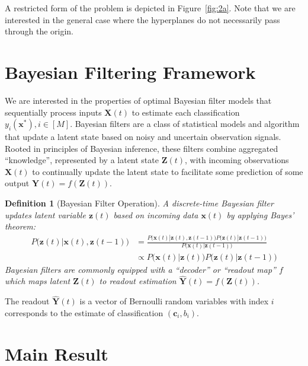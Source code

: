 \documentclass[12pt]{article}
\newtheorem{definition}{Definition}
\begin{document}
A restricted form of the problem is depicted in Figure~\ref{fig:2a}. Note that we are interested in the general case where the hyperplanes do not necessarily pass through the origin. 




\section{Bayesian Filtering Framework}

We are interested in the properties of optimal Bayesian filter models that sequentially process inputs $\mathbf X(t)$ to estimate each classification $y_i(\mathbf x^*), i\in [M]$. 
Bayesian filters are a class of statistical models and algorithm that update a latent state based on noisy and uncertain observation signals. 
Rooted in principles of Bayesian inference, these filters combine aggregated ``knowledge'', represented by a latent state $\mathbf Z(t)$, with incoming observations $\mathbf X(t)$ to continually update the latent state to facilitate some prediction of some output $\mathbf Y(t) = f(\mathbf Z(t))$. 


\begin{definition}[Bayesian Filter Operation]
	\label{def:bayesian_filter}
	A discrete-time Bayesian filter updates latent variable $\mathbf z(t)$
	based on incoming data $\mathbf x(t)$ by applying Bayes' theorem: 
	\begin{align}
		\label{eqn:bayes_filter}
		P \big(\mathbf z(t) | \mathbf  x(t), \mathbf z(t-1)\big) &= \frac{
			P\big(\mathbf x(t) | \mathbf z(t), \mathbf z(t-1)\big) 
			P\big(\mathbf z(t) | \mathbf z(t-1)\big)
		}{
			P\big(\mathbf x(t) | \mathbf z(t-1)\big)
		} \\
		&\propto P\big(\mathbf x(t) | \mathbf z(t) \big) 
			P\big(\mathbf z(t) | \mathbf z(t-1)\big)
	\end{align}
	Bayesian filters are commonly equipped with a ``decoder'' or ``readout
	map'' $f$ which maps latent $\mathbf Z(t)$ to readout estimation
	$\hat{\mathbf Y}(t) = f(\mathbf Z(t))$.
\end{definition}


The readout $\hat{\mathbf Y}(t)$ is a vector of Bernoulli random variables with index $i$ corresponds to the estimate of classification $(\mathbf c_i, b_i)$. 






\section{Main Result}
\end{document}
